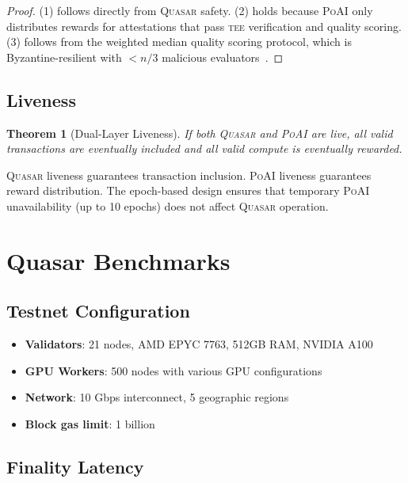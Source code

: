 \documentclass[11pt,letterpaper]{article}
\newtheorem{theorem}{Theorem}[section]
\newcommand{\PoAI}{\textsc{PoAI}}
\newcommand{\Quasar}{\textsc{Quasar}}
\newcommand{\TEE}{\textsc{tee}}
\begin{document}
\begin{proof}
(1) follows directly from \Quasar{} safety. (2) holds because \PoAI{} only distributes rewards for attestations that pass \TEE{} verification and quality scoring. (3) follows from the weighted median quality scoring protocol, which is Byzantine-resilient with $< n/3$ malicious evaluators~\cite{zoo-poai-consensus}.
\end{proof}

\subsection{Liveness}

\begin{theorem}[Dual-Layer Liveness]
If both \Quasar{} and \PoAI{} are live, all valid transactions are eventually included and all valid compute is eventually rewarded.
\end{theorem}

\Quasar{} liveness guarantees transaction inclusion. \PoAI{} liveness guarantees reward distribution. The epoch-based design ensures that temporary \PoAI{} unavailability (up to 10 epochs) does not affect \Quasar{} operation.

\section{Quasar Benchmarks}
\label{sec:quasar-bench}

\subsection{Testnet Configuration}

\begin{itemize}
    \item \textbf{Validators}: 21 nodes, AMD EPYC 7763, 512GB RAM, NVIDIA A100
    \item \textbf{GPU Workers}: 500 nodes with various GPU configurations
    \item \textbf{Network}: 10 Gbps interconnect, 5 geographic regions
    \item \textbf{Block gas limit}: 1 billion
\end{itemize}

\subsection{Finality Latency}
\end{document}
